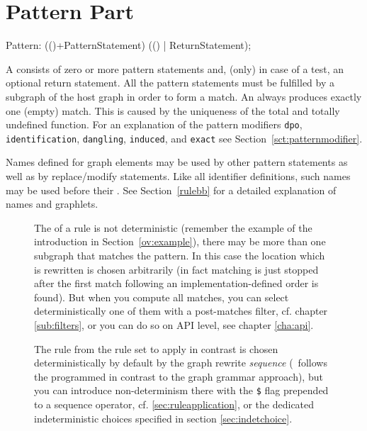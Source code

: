 \section{Pattern Part}
\label{patternpart}
\begin{rail}
  Pattern: (()+PatternStatement) (() | ReturnStatement);
\end{rail}
A  consists of zero or more pattern statements and, (only) in case of a test, an optional return statement.
All the pattern statements must be fulfilled by a subgraph of the host graph in order to form a match.
An  always produces exactly one (empty) match.
This is caused by the uniqueness of the total and totally undefined function.
For an explanation of the pattern modifiers \texttt{dpo}, \texttt{identification}, \texttt{dangling}, \texttt{induced}, and \texttt{exact} see Section~\ref{sct:patternmodifier}.

Names defined for graph elements may be used by other pattern statements as well as by replace/modify statements.
Like all identifier definitions, such names may be used before their .
See Section~\ref{rulebb} for a detailed explanation of names and graphlets.

\begin{figure}[htbp]
\begin{warning}
\label{note:indeterminism}
The  of a rule is not deterministic (remember the example of the introduction in Section~\ref{ov:example}), there may be more than one subgraph that matches the pattern.
In this case the location which is rewritten is chosen arbitrarily (in fact matching is just stopped after the first match following an implementation-defined order is found).
But when you compute all matches, you can select deterministically one of them with a post-matches filter, cf. chapter \ref{sub:filters}, or you can do so on API level, see chapter \ref{cha:api}.

The rule from the rule set to apply in contrast is chosen deterministically by default by the graph rewrite \emph{sequence}  (\GrG\ follows the programmed in contrast to the graph grammar approach),
but you can introduce non-determinism there with the \texttt{\$} flag prepended to a sequence operator, cf. \ref{sec:ruleapplication}, or the dedicated indeterministic choices specified in section \ref{sec:indetchoice}.
\end{warning}
\end{figure}

